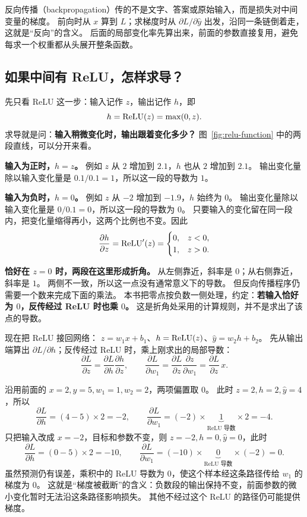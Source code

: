 

\begin{idea}
反向传播（backpropagation）传的不是文字、答案或原始输入，而是损失对中间变量的梯度。
前向时从 $x$ 算到 $L$；求梯度时从 $\partial L/\partial\widehat{y}$ 出发，沿同一条链倒着走，这就是“反向”的含义。
后面的局部变化率先算出来，前面的参数直接复用，避免每求一个权重都从头展开整条函数。
\end{idea}\label{route:backprop-end}

\subsection{如果中间有 ReLU，怎样求导？}

先只看 ReLU 这一步：输入记作 $z$，输出记作 $h$，即
\[
h=\operatorname{ReLU}(z)=\max(0,z).
\]
求导就是问：\textbf{输入稍微变化时，输出跟着变化多少？}
图~\ref{fig:relu-function} 中的两段直线，可以分开来看。

\textbf{输入为正时，$h=z$。}
例如 $z$ 从 $2$ 增加到 $2.1$，$h$ 也从 $2$ 增加到 $2.1$。
输出变化量除以输入变化量是 $0.1/0.1=1$，所以这一段的导数为 $1$。

\textbf{输入为负时，$h=0$。}
例如 $z$ 从 $-2$ 增加到 $-1.9$，$h$ 始终为 $0$。
输出变化量除以输入变化量是 $0/0.1=0$，所以这一段的导数为 $0$。
只要输入的变化留在同一段内，把变化量缩得再小，这两个比例也不变。因此
\[
\frac{\partial h}{\partial z}=\operatorname{ReLU}'(z)=
\begin{cases}
0,&z<0,\\
1,&z>0.
\end{cases}
\]

\textbf{恰好在 $z=0$ 时，两段在这里形成折角。}
从左侧靠近，斜率是 $0$；从右侧靠近，斜率是 $1$。
两侧不一致，所以这一点没有通常意义下的导数。
但反向传播程序仍需要一个数来完成下面的乘法。
本书把零点按负数一侧处理，约定：\textbf{若输入恰好为 $0$，反传经过 ReLU 时也乘 $0$。}
这是折角处采用的计算规则，并不是求出了该点的导数。

现在把 ReLU 接回网络：
$z=w_1x+b_1$、$h=\operatorname{ReLU}(z)$、$\widehat{y}=w_2h+b_2$。
先从输出端算出 $\partial L/\partial h$；反传经过 ReLU 时，乘上刚求出的局部导数：
\[
\frac{\partial L}{\partial z}
=\frac{\partial L}{\partial h}\frac{\partial h}{\partial z},\qquad
\frac{\partial L}{\partial w_1}
=\frac{\partial L}{\partial z}\frac{\partial z}{\partial w_1}
=\frac{\partial L}{\partial z}\,x.
\]

沿用前面的 $x=2,y=5,w_1=1,w_2=2$，两项偏置取 $0$。
此时 $z=2,h=2,\widehat{y}=4$，所以
\[
\frac{\partial L}{\partial h}=(4-5)\times2=-2,\qquad
\frac{\partial L}{\partial w_1}=(-2)\times\underbrace{1}_{\text{ReLU 导数}}\times2=-4.
\]
只把输入改成 $x=-2$，目标和参数不变，则 $z=-2,h=0,\widehat{y}=0$，此时
\[
\frac{\partial L}{\partial h}=(0-5)\times2=-10,\qquad
\frac{\partial L}{\partial w_1}=(-10)\times\underbrace{0}_{\text{ReLU 导数}}\times(-2)=0.
\]
虽然预测仍有误差，乘积中的 ReLU 导数为 $0$，使这个样本经这条路径传给 $w_1$ 的梯度为 $0$。
这就是“梯度被截断”的含义：负数段的输出保持不变，前面参数的微小变化暂时无法沿这条路径影响损失。
其他不经过这个 ReLU 的路径仍可能提供梯度。

